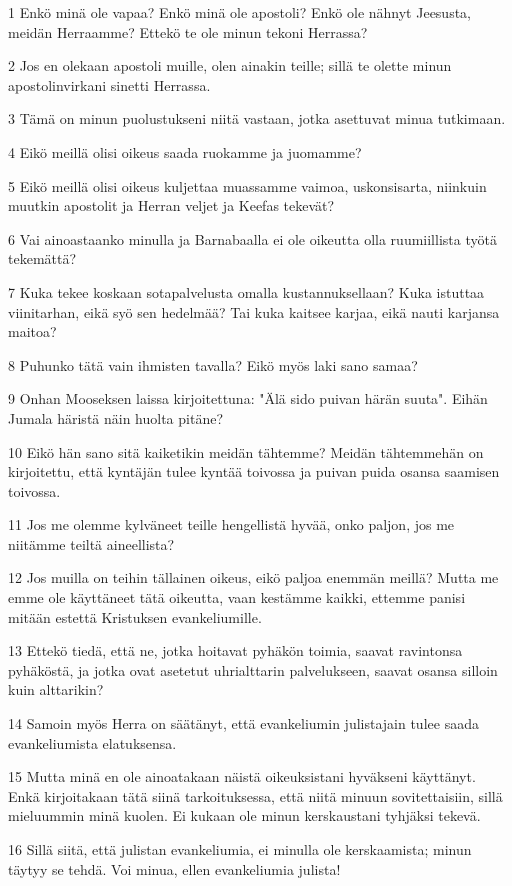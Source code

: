 \par 1 Enkö minä ole vapaa? Enkö minä ole apostoli? Enkö ole nähnyt Jeesusta, meidän Herraamme? Ettekö te ole minun tekoni Herrassa?
\par 2 Jos en olekaan apostoli muille, olen ainakin teille; sillä te olette minun apostolinvirkani sinetti Herrassa.
\par 3 Tämä on minun puolustukseni niitä vastaan, jotka asettuvat minua tutkimaan.
\par 4 Eikö meillä olisi oikeus saada ruokamme ja juomamme?
\par 5 Eikö meillä olisi oikeus kuljettaa muassamme vaimoa, uskonsisarta, niinkuin muutkin apostolit ja Herran veljet ja Keefas tekevät?
\par 6 Vai ainoastaanko minulla ja Barnabaalla ei ole oikeutta olla ruumiillista työtä tekemättä?
\par 7 Kuka tekee koskaan sotapalvelusta omalla kustannuksellaan? Kuka istuttaa viinitarhan, eikä syö sen hedelmää? Tai kuka kaitsee karjaa, eikä nauti karjansa maitoa?
\par 8 Puhunko tätä vain ihmisten tavalla? Eikö myös laki sano samaa?
\par 9 Onhan Mooseksen laissa kirjoitettuna: "Älä sido puivan härän suuta". Eihän Jumala häristä näin huolta pitäne?
\par 10 Eikö hän sano sitä kaiketikin meidän tähtemme? Meidän tähtemmehän on kirjoitettu, että kyntäjän tulee kyntää toivossa ja puivan puida osansa saamisen toivossa.
\par 11 Jos me olemme kylväneet teille hengellistä hyvää, onko paljon, jos me niitämme teiltä aineellista?
\par 12 Jos muilla on teihin tällainen oikeus, eikö paljoa enemmän meillä? Mutta me emme ole käyttäneet tätä oikeutta, vaan kestämme kaikki, ettemme panisi mitään estettä Kristuksen evankeliumille.
\par 13 Ettekö tiedä, että ne, jotka hoitavat pyhäkön toimia, saavat ravintonsa pyhäköstä, ja jotka ovat asetetut uhrialttarin palvelukseen, saavat osansa silloin kuin alttarikin?
\par 14 Samoin myös Herra on säätänyt, että evankeliumin julistajain tulee saada evankeliumista elatuksensa.
\par 15 Mutta minä en ole ainoatakaan näistä oikeuksistani hyväkseni käyttänyt. Enkä kirjoitakaan tätä siinä tarkoituksessa, että niitä minuun sovitettaisiin, sillä mieluummin minä kuolen. Ei kukaan ole minun kerskaustani tyhjäksi tekevä.
\par 16 Sillä siitä, että julistan evankeliumia, ei minulla ole kerskaamista; minun täytyy se tehdä. Voi minua, ellen evankeliumia julista!
